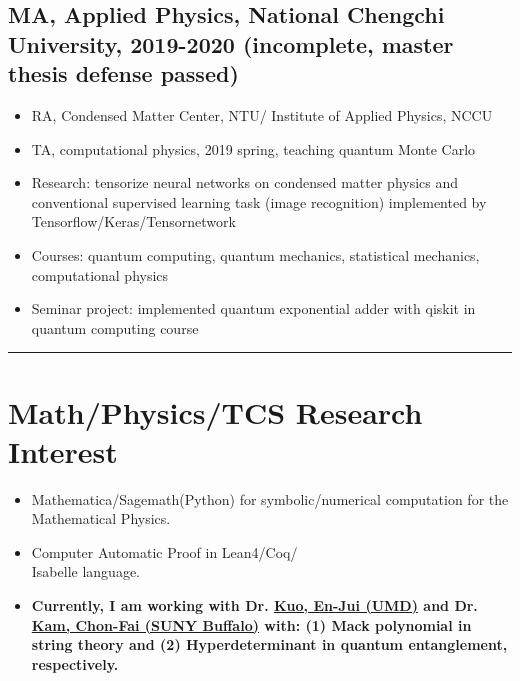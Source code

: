 \documentclass[11pt]{article}
\begin{document}
\begin{multicols*}{2}
\subsection*{MA, Applied Physics, National Chengchi University, 2019-2020 (incomplete, master thesis defense passed)}

    \begin{itemize}[noitemsep]
        \item RA, Condensed Matter Center, NTU/ Institute of Applied Physics, NCCU
        \item TA, computational physics, 2019 spring, teaching quantum Monte Carlo
        \item Research: tensorize neural networks on condensed matter physics and conventional supervised learning task (image recognition) implemented by Tensorflow/Keras/Tensornetwork
        \item Courses: quantum computing, quantum mechanics, statistical mechanics, computational physics
        \item Seminar project: implemented quantum exponential adder with qiskit in quantum computing course 
    \end{itemize}

\hrule

\section*{Math/Physics/TCS Research Interest}
\begin{itemize}[noitemsep]
    \item Mathematica/Sagemath(Python) for symbolic/numerical computation for the Mathematical Physics.
    \item Computer Automatic Proof in Lean4/Coq/\\Isabelle language.  
    \item \textbf{ Currently, I am working with Dr. \href{https://www.bing.com/search?q=en-jui+kuo&gs_lcrp=EgZjaHJvbWUqBggBEEUYOzIGCAAQRRg5MgYIARBFGDsyBggCEEUYOzIGCAMQRRg7MgYIBBAAGEAyBggFEAAYQDIGCAYQRRg9MgYIBxBFGDwyBggIEEUYPNIBCDE2NjVqMGoxqAIAsAIA&FORM=ANAB01&PC=HCTS}{Kuo, En-Jui (UMD)} and Dr. \href{https://scholar.google.com.hk/citations?user=38TPAxMAAAAJ&hl=en}{Kam, Chon-Fai (SUNY Buffalo)} with: (1) Mack polynomial in string theory and (2) Hyperdeterminant in quantum entanglement, respectively. }
\end{itemize}


\end{multicols*}
\end{document}
